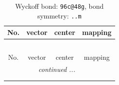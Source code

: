 \documentclass[fleqn,8pt]{jsarticle}
\begin{document}
\renewcommand{\arraystretch}{1.2}
\begin{longtable}{cccc}
\caption{Wyckoff bond: {\tt 96c@48g}, bond symmetry: {\tt ..m}}
 \\
 \hline \hline
No. & vector & center & mapping \\ \hline \endfirsthead

\multicolumn{3}{l}{\tablename\ \thetable{}} \\
 \hline \hline
No. & vector & center & mapping \\ \hline \endhead

 \hline \hline
\multicolumn{3}{r}{\footnotesize\it continued ...} \\ \endfoot

 \hline \hline
\multicolumn{3}{r}{} \\ \endlastfoot


\end{longtable}
\end{document}
